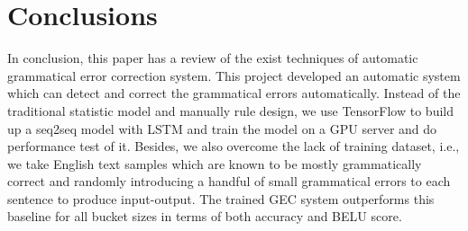 \chapter{Conclusions}
\label{chapter7}

In conclusion, this paper has a review of the exist techniques of automatic grammatical error correction system. This project developed an automatic system which can detect and correct the grammatical errors automatically. Instead of the traditional statistic model and manually rule design, we use TensorFlow to build up a seq2seq model with LSTM and train the model on a GPU server and do performance test of it. Besides, we also overcome the lack of training dataset, i.e., we take English text samples which are known to be mostly grammatically correct and randomly introducing a handful of small grammatical errors to each sentence to produce input-output. The trained GEC system outperforms this baseline for all bucket sizes in terms of both accuracy and BELU score. 